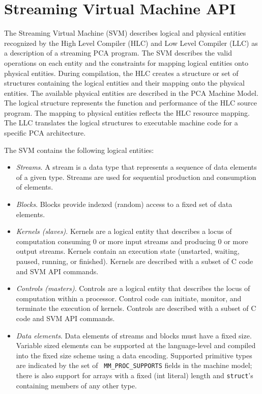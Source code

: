 \section{Streaming Virtual Machine API}

The Streaming Virtual Machine (SVM) describes logical and physical
entities recognized by the High Level Compiler (HLC) and Low Level
Compiler (LLC) as a description of a streaming PCA program.  The SVM
describes the valid operations on each entity and the constraints for
mapping logical entities onto physical entities.  During compilation,
the HLC creates a structure or set of structures containing the
logical entities and their mapping onto the physical entities.  The
available physical entities are described in the PCA Machine Model.
The logical structure represents the function and performance of the
HLC source program.  The mapping to physical entities reflects the HLC
resource mapping.  The LLC translates the logical structures to
executable machine code for a specific PCA architecture.


The SVM contains the following logical entities:

\begin{itemize}

\item {\it Streams}.  A stream is a data type that represents a
sequence of data elements of a given type.  Streams are used for
sequential production and consumption of elements.

\item {\it Blocks}. Blocks provide indexed (random) access to a fixed
set of data elements.

\item {\it Kernels (slaves)}. Kernels are a logical entity that
describes a locus of computation consuming 0 or more input streams and
producing 0 or more output streams.  Kernels contain an execution
state (unstarted, waiting, paused, running, or finished).  Kernels are
described with a subset of C code and SVM API commands.

\item {\it Controls (masters)}. Controls are a logical entity that
describes the locus of computation within a processor.  Control code
can initiate, monitor, and terminate the execution of kernels.
Controls are described with a subset of C code and SVM API commands.

\item {\it Data elements}. Data elements of streams and blocks must
have a fixed size.  Variable sized elements can be supported at the
language-level and compiled into the fixed size scheme using a data
encoding.  Supported primitive types are indicated by the set of {\tt
MM\_PROC\_SUPPORTS} fields in the machine model; there is also support
for arrays with a fixed (int literal) length and {\tt struct}'s
containing members of any other type.

\end{itemize}

